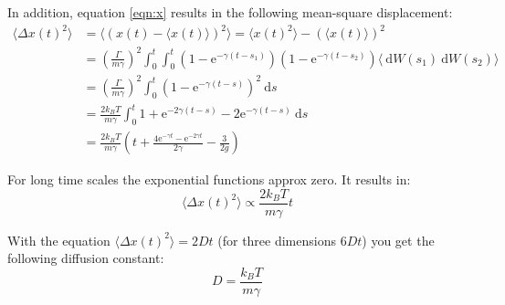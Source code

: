 \documentclass[12pt,a4paper]{scrartcl}
\begin{document}
In addition, equation \ref{eqn:x} results in the following mean-square displacement:
\begin{align}
\langle \Delta x(t)^2 \rangle &= \langle \left( x(t) - \langle x(t) \rangle \right)^2 \rangle = \langle x(t)^2 \rangle - \left( \langle x(t)\rangle \right)^2 \\
&= \left(\frac{\Gamma}{m \gamma} \right)^2 \int_0^t \int_0^t \left(1-\text{e}^{-\gamma (t-s_1)} \right) \left(1-\text{e}^{-\gamma (t-s_2)} \right) \langle ~\text{d}W(s_1) ~\text{d}W(s_2) \rangle \\
&= \left( \frac{\Gamma}{m \gamma} \right)^2 \int_0^t \left(1-\text{e}^{-\gamma (t-s)} \right)^2 ~\text{d}s \\
&= \frac{2 k_B T}{m \gamma} \int_0^t 1+\text{e}^{-2\gamma (t-s)}-2\text{e}^{-\gamma (t-s)} ~\text{d}s \\
&= \frac{2 k_B T}{m \gamma} \left( t + \frac{4\text{e}^{-\gamma t}-\text{e}^{-2\gamma t}}{2 \gamma} - \frac{3}{2g}\right)
\end{align}


For long time scales the exponential functions approx zero. It results in:
\begin{equation}
\langle \Delta x(t)^2 \rangle \varpropto \frac{2 k_B T}{m \gamma} t
\end{equation}

With the equation  $\langle \Delta x(t)^2 \rangle = 2 D t$ (for three dimensions $6 D t$) you get the following diffusion constant:
\begin{equation}
D = \frac{k_B T}{m \gamma}
\end{equation}
\end{document}
